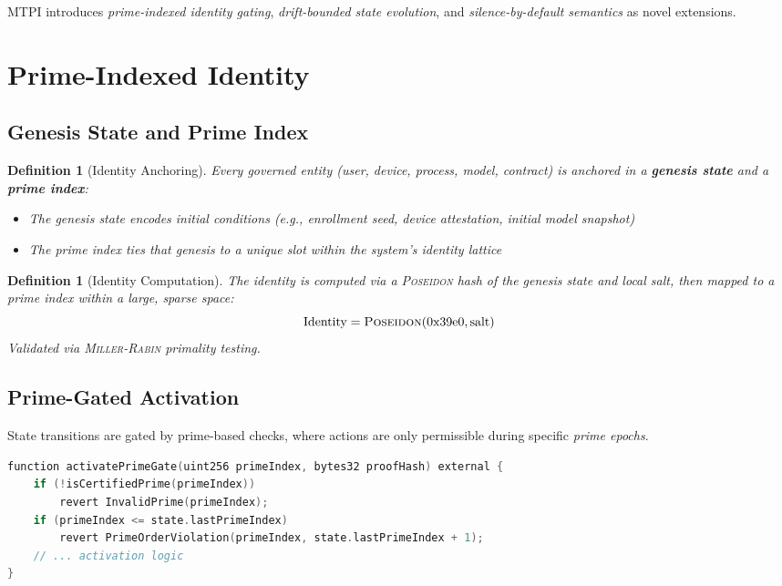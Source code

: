 \documentclass[11pt,a4paper]{article}
\newtheorem{definition}[theorem]{Definition}
\newcommand{\Poseidon}{\textsc{Poseidon}}
\newcommand{\MillerRabin}{\textsc{Miller-Rabin}}
\begin{document}
MTPI introduces \emph{prime-indexed identity gating}, \emph{drift-bounded state evolution}, and \emph{silence-by-default semantics} as novel extensions.

\section{Prime-Indexed Identity}

\subsection{Genesis State and Prime Index}

\begin{definition}[Identity Anchoring]
Every governed entity (user, device, process, model, contract) is anchored in a \textbf{genesis state} and a \textbf{prime index}:
\begin{itemize}[noitemsep]
    \item The genesis state encodes initial conditions (e.g., enrollment seed, device attestation, initial model snapshot)
    \item The prime index ties that genesis to a unique slot within the system's identity lattice
\end{itemize}
\end{definition}

\begin{definition}[Identity Computation]
The identity is computed via a \Poseidon{} hash of the genesis state and local salt, then mapped to a prime index within a large, sparse space:
\begin{equation}
    \text{Identity} = \Poseidon(0\text{x}39\text{e}0, \text{salt})
    \label{eq:identity}
\end{equation}
Validated via \MillerRabin{} primality testing.
\end{definition}

\subsection{Prime-Gated Activation}

State transitions are gated by prime-based checks, where actions are only permissible during specific \emph{prime epochs}.

\begin{lstlisting}[language=C,caption={Prime-Gated Activation (Solidity pseudocode)}]
function activatePrimeGate(uint256 primeIndex, bytes32 proofHash) external {
    if (!isCertifiedPrime(primeIndex)) 
        revert InvalidPrime(primeIndex);
    if (primeIndex <= state.lastPrimeIndex) 
        revert PrimeOrderViolation(primeIndex, state.lastPrimeIndex + 1);
    // ... activation logic
}
\end{lstlisting}
\end{document}
